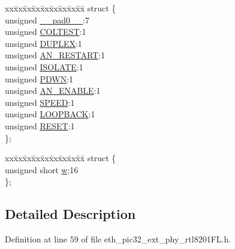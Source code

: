 \begin{DoxyCompactItemize}
\begin{tabbing}
\end{tabbing}\item 
\begin{tabbing}
xx\=xx\=xx\=xx\=xx\=xx\=xx\=xx\=xx\=\kill
struct \{\\
\>unsigned \hyperlink{union_____b_m_c_o_nbits__t_adf71f3d8410c1f1dbbc96680a92c49af}{\_\_pad0\_\_}:7\\
\>unsigned \hyperlink{union_____b_m_c_o_nbits__t_a9c09d7e7c7ef351fc2b6c37785069ab1}{COLTEST}:1\\
\>unsigned \hyperlink{union_____b_m_c_o_nbits__t_aad2d5b585da6df0c08919f0e0749562e}{DUPLEX}:1\\
\>unsigned \hyperlink{union_____b_m_c_o_nbits__t_a1d18945aae4c125b483cbab7196fa3bc}{AN\_RESTART}:1\\
\>unsigned \hyperlink{union_____b_m_c_o_nbits__t_a08f1e090660f38e2c355348499059646}{ISOLATE}:1\\
\>unsigned \hyperlink{union_____b_m_c_o_nbits__t_a1d62ad60d164ae9584ed177c6d49d0c2}{PDWN}:1\\
\>unsigned \hyperlink{union_____b_m_c_o_nbits__t_ac70b16effdab4243521af72c0c4561d2}{AN\_ENABLE}:1\\
\>unsigned \hyperlink{union_____b_m_c_o_nbits__t_a95fd4dafd860304d6b44d4fb14881daa}{SPEED}:1\\
\>unsigned \hyperlink{union_____b_m_c_o_nbits__t_ac7c74d910281b89b2cbb9179d671358c}{LOOPBACK}:1\\
\>unsigned \hyperlink{union_____b_m_c_o_nbits__t_abd544ef72bf6c8e26d48024e20c2ac9b}{RESET}:1\\
\}; \\

\end{tabbing}\item 
\begin{tabbing}
xx\=xx\=xx\=xx\=xx\=xx\=xx\=xx\=xx\=\kill
struct \{\\
\>unsigned short \hyperlink{union_____b_m_c_o_nbits__t_a160850a4684a3e82c2323033964f2e98}{w}:16\\
\}; \\

\end{tabbing}\end{DoxyCompactItemize}


\subsection{Detailed Description}


Definition at line 59 of file eth\+\_\+pic32\+\_\+ext\+\_\+phy\+\_\+rtl8201\+F\+L.\+h.



